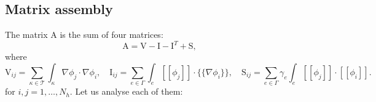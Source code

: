 \documentclass[12pt, a4paper]{article}
\theoremstyle{definition}
\theoremstyle{plain}
\theoremstyle{plain}
\theoremstyle{definition}
\begin{document}
\subsection{Matrix assembly}
The matrix $\mathrm{A}$ is the sum of four matrices:
\begin{equation*}
	\mathrm{A} = \mathrm{V} - \mathrm{I} - \mathrm{I}^T + \mathrm{S},
\end{equation*}
where
\begin{equation*}
	\mathrm{V}_{ij} = \sum_{\kappa \in \mathcal{T}} \int_\kappa \nabla \phi_j \cdot \nabla \phi_i,
	\quad \mathrm{I}_{ij} = \sum_{e \in \Gamma} \int_e [\![\phi_j]\!] \cdot \{\!\!\{ \nabla \phi_i \}\!\!\},
	\quad \mathrm{S}_{ij} = \sum_{e \in \Gamma} \gamma_e \int_e [\![ \phi_j ]\!] \cdot [\![ \phi_i ]\!].
\end{equation*}
for $i,j = 1,\dots, N_h$. Let us analyse each of them:
\end{document}
